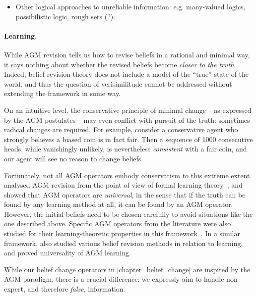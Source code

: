 {\begin{notes}
    \begin{itemize}
        \item Other logical approaches to unreliable information: e.g.
              many-valued logics, possibilistic logic, rough sets (?).
    \end{itemize}
\end{notes}

\paragraph{Learning.}

While AGM revision tells us how to revise beliefs in a rational and minimal
way, it says nothing about whether the revised beliefs become \emph{closer to
the truth}. Indeed, belief revision theory does not include a model of the
``true'' state of the world, and thus the question of verisimilitude cannot be
addressed without extending the framework in some way.

On an intuitive level, the conservative principle of minimal change -- as
expressed by the AGM postulates -- may even conflict with pursuit of the truth:
sometimes radical changes are required. For example, consider a conservative
agent who strongly believes a biased coin is in fact fair. Then a sequence of
1000 consecutive heads, while vanishingly unlikely, is nevertheless
\emph{consistent} with a fair coin, and our agent will see no reason to change
beliefs.

Fortunately, not all AGM operators embody conservatism to this extreme extent.
\textcite{kelly1997reliable} analysed AGM revision from the point of view of
formal learning
theory~\cites{jain1999systems}[]{gierasimczuk2010knowing},
and showed that AGM operators are \emph{universal}, in the sense that if the
truth can be found by any learning method at all, it can be found by an AGM
operator. However, the initial beliefs need to be chosen carefully to avoid
situations like the one described above. Specific AGM operators from the
literature were also studied for their learning-theoretic properties in this
framework~\cite{kelly1998learning,Kelly_1999}. In a similar framework,
\textcite{gierasimczuk2010knowing,baltag_tt_2019,Baltag_2016} also studied
various belief revision methods in relation to learning, and proved
universality of AGM learning.

While our belief change operators in \cref{chapter_belief_change} are inspired
by the AGM paradigm, there is a crucial difference: we expressly aim to handle
non-expert, and therefore \emph{false}, information. 

}

